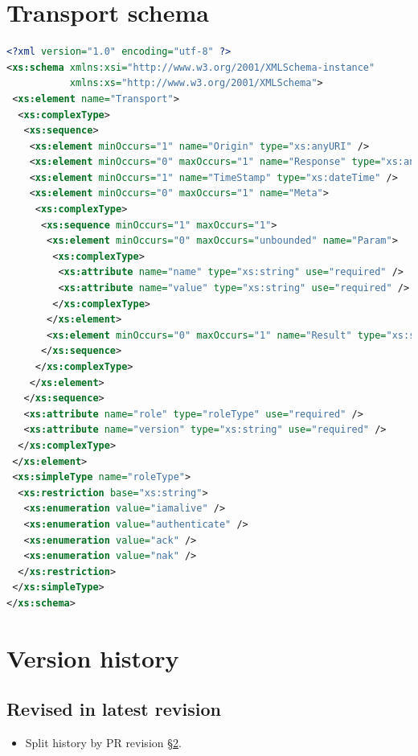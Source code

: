 \documentclass[a4paper,11pt]{ivoa}
\begin{document}
\section{Transport schema}
\label{sec:transportschema}

\begin{lstlisting}[language=XML]
<?xml version="1.0" encoding="utf-8" ?>
<xs:schema xmlns:xsi="http://www.w3.org/2001/XMLSchema-instance"
           xmlns:xs="http://www.w3.org/2001/XMLSchema">
 <xs:element name="Transport">
  <xs:complexType>
   <xs:sequence>
    <xs:element minOccurs="1" name="Origin" type="xs:anyURI" />
    <xs:element minOccurs="0" maxOccurs="1" name="Response" type="xs:anyURI" />
    <xs:element minOccurs="1" name="TimeStamp" type="xs:dateTime" />
    <xs:element minOccurs="0" maxOccurs="1" name="Meta">
     <xs:complexType>
      <xs:sequence minOccurs="1" maxOccurs="1">
       <xs:element minOccurs="0" maxOccurs="unbounded" name="Param">
        <xs:complexType>
         <xs:attribute name="name" type="xs:string" use="required" />
         <xs:attribute name="value" type="xs:string" use="required" />
        </xs:complexType>
       </xs:element>
       <xs:element minOccurs="0" maxOccurs="1" name="Result" type="xs:string" />
      </xs:sequence>
     </xs:complexType>
    </xs:element>
   </xs:sequence>
   <xs:attribute name="role" type="roleType" use="required" />
   <xs:attribute name="version" type="xs:string" use="required" />
  </xs:complexType>
 </xs:element>
 <xs:simpleType name="roleType">
  <xs:restriction base="xs:string">
   <xs:enumeration value="iamalive" />
   <xs:enumeration value="authenticate" />
   <xs:enumeration value="ack" />
   <xs:enumeration value="nak" />
  </xs:restriction>
 </xs:simpleType>
</xs:schema>
\end{lstlisting}

\section{Version history}
\label{sec:history}

\subsection{Revised in latest revision}

\begin{itemize}

    \item{Split history by PR revision \S\ref{sec:history}.}

\end{itemize}
\end{document}

